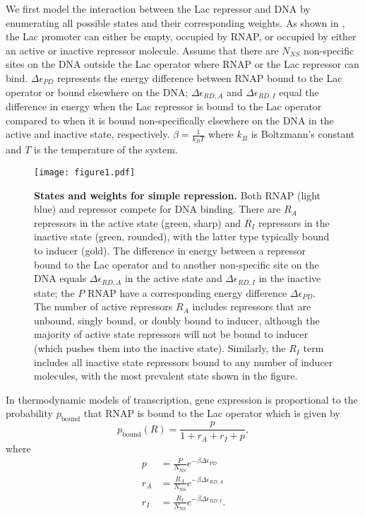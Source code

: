 \documentclass[10pt,letterpaper]{article}
\newcommand\globalScalePlots{1}
\begin{document}
We first model the interaction between the Lac repressor and DNA by enumerating
all possible states and their corresponding weights. As shown in
\fref[figpolymeraseRepressorStates], the Lac promoter can either be empty,
occupied by RNAP, or occupied by either an active or inactive repressor
molecule. Assume that there are $N_{NS}$ non-specific sites on the DNA outside
the Lac operator where RNAP or the Lac repressor can bind. \(\Delta\epsilon_{PD}\)
represents the energy difference between RNAP bound to the Lac operator or bound
elsewhere on the DNA; \(\Delta\epsilon _{RD,A}\) and \(\Delta\epsilon _{RD,I}\) equal the
difference in energy when the Lac repressor is bound to the Lac operator
compared to when it is bound non-specifically elsewhere on the DNA in the active
and inactive state, respectively. $\beta = \frac{1}{k_BT}$ where $k_B$ is
Boltzmann's constant and $T$ is the temperature of the system.

\begin{figure}[h]
	\centering \texttt{[image: figure1.pdf]}
	\caption{{\bf States and weights for simple repression.} Both RNAP (light blue)
		and repressor compete for DNA binding. There are $R_A$ repressors in the active
		state (green, sharp) and $R_I$ repressors in the inactive state (green,
		rounded), with the latter type typically bound to inducer (gold). The
		difference in energy between a repressor bound to the Lac operator and to
		another non-specific site on the DNA equals $\Delta\epsilon_{RD,A}$ in the
		active state and $\Delta\epsilon_{RD,I}$ in the inactive state; the $P$ RNAP
		have a corresponding energy difference $\Delta\epsilon_{PD}$. The number of
		active repressors $R_A$ includes repressors that are unbound, singly bound, or
		doubly bound to inducer, although the majority of active state repressors will
		not be bound to inducer (which pushes them into the inactive state). Similarly,
		the $R_I$ term includes all inactive state repressors bound to any number of
		inducer molecules, with the most prevalent state shown in the figure.}
	\label{figpolymeraseRepressorStates}
\end{figure}

In thermodynamic models of transcription, gene expression is proportional to the
probability $p_{\text{bound}}$ that RNAP is bound to the Lac operator which is
given by
\begin{equation}\label{eq2}
p_{\text{bound}}(R)=\frac{p}{1+r_A+r_I+p},
\end{equation}
where
\begin{align}
p &= \frac{P}{N_{\text{NS}}}e^{-\beta  \Delta\epsilon _{PD}} \\
r_A &= \frac{R_A}{N_{\text{NS}}}e^{-\beta \Delta\epsilon _{RD,A}} \\
r_I &= \frac{R_I}{N_{\text{NS}}}e^{-\beta  \Delta\epsilon _{RD,I}}.
\end{align}
\end{document}
